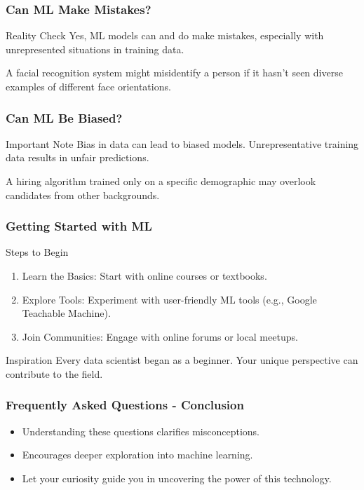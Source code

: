 \documentclass[aspectratio=169]{beamer}
\begin{document}
\begin{frame}[fragile]
    \frametitle{Can ML Make Mistakes?}
    \begin{block}{Reality Check}
        Yes, ML models can and do make mistakes, especially with unrepresented situations in training data.
    \end{block}
    \begin{example}
        A facial recognition system might misidentify a person if it hasn’t seen diverse examples of different face orientations.
    \end{example}
\end{frame}

\begin{frame}[fragile]
    \frametitle{Can ML Be Biased?}
    \begin{block}{Important Note}
        Bias in data can lead to biased models. Unrepresentative training data results in unfair predictions.
    \end{block}
    \begin{example}
        A hiring algorithm trained only on a specific demographic may overlook candidates from other backgrounds.
    \end{example}
\end{frame}

\begin{frame}[fragile]
    \frametitle{Getting Started with ML}
    \begin{block}{Steps to Begin}
        \begin{enumerate}
            \item Learn the Basics: Start with online courses or textbooks.
            \item Explore Tools: Experiment with user-friendly ML tools (e.g., Google Teachable Machine).
            \item Join Communities: Engage with online forums or local meetups.
        \end{enumerate}
    \end{block}
    \begin{block}{Inspiration}
        Every data scientist began as a beginner. Your unique perspective can contribute to the field.
    \end{block}
\end{frame}

\begin{frame}[fragile]
    \frametitle{Frequently Asked Questions - Conclusion}
    \begin{itemize}
        \item Understanding these questions clarifies misconceptions.
        \item Encourages deeper exploration into machine learning.
        \item Let your curiosity guide you in uncovering the power of this technology.
    \end{itemize}
\end{frame}
\end{document}
